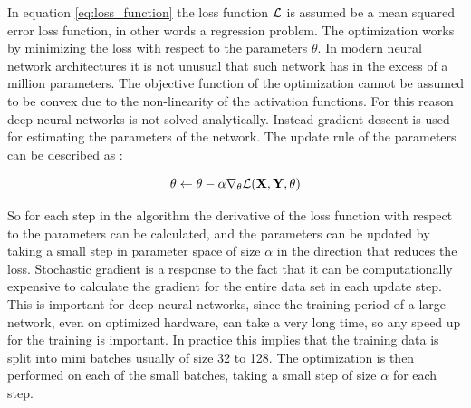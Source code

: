 In equation \eqref{eq:loss_function} the loss function $\mathcal{L}$ is assumed be a mean squared error loss function, in other words a regression problem. The optimization works by minimizing the loss with respect to the parameters $\theta$. In modern neural network architectures it is not unusual that such network has in the excess of a million parameters. The objective function of the optimization cannot be assumed to be convex due to the non-linearity of the activation functions. For this reason deep neural networks is not solved analytically. Instead gradient descent is used for estimating the parameters of the network. The update rule of the parameters can be described as \parencite{goodfellow_deep_2016}:

\begin{equation}
    \theta \leftarrow \theta - \alpha \nabla_{\theta} \mathcal{L}(\textbf{X}, \textbf{Y}, \theta)
\end{equation}

So for each step in the algorithm the derivative of the loss function with respect to the parameters can be calculated, and the parameters can be updated by taking a small step in parameter space of size $\alpha$ in the direction that reduces the loss. Stochastic gradient is a response to the fact that it can be computationally expensive to calculate the gradient for the entire data set in each update step. This is important for deep neural networks, since the training period of a large network, even on optimized hardware, can take a very long time, so any speed up for the training is important. In practice this implies that the training data is split into mini batches usually of size 32 to 128. The optimization is then performed on each of the small batches, taking a small step of size $\alpha$ for each step.


